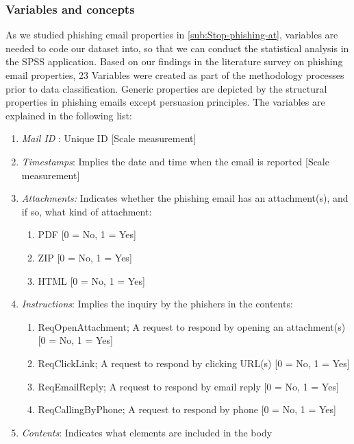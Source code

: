 \subsubsection{\label{sub:variables}Variables and concepts}

As we studied phishing email properties in \autoref{sub:Stop-phishing-at},
variables are needed to code our dataset into, so that we can conduct
the statistical analysis in the SPSS application. Based on our findings
in the literature survey on phishing email properties, 23 Variables
were created as part of the methodology processes prior to data classification.
Generic properties are depicted by the structural properties in phishing
emails except persuasion principles. The variables are explained in
the following list:
\begin{enumerate}
\item \emph{Mail ID} : Unique ID {[}Scale measurement{]}
\item \emph{Timestamps}: Implies the date and time when the email is reported
{[}Scale measurement{]}
\item \emph{Attachments:} Indicates whether the phishing email has an attachment(s),
and if so, what kind of attachment:

\begin{enumerate}
\item PDF {[}0 = No, 1 = Yes{]}
\item ZIP {[}0 = No, 1 = Yes{]}
\item HTML {[}0 = No, 1 = Yes{]}
\end{enumerate}
\item \textit{Instructions}: Implies the inquiry by the phishers in the
contents:

\begin{enumerate}
\item ReqOpenAttachment; A request to respond by opening an attachment(s)
{[}0 = No, 1 = Yes{]}
\item ReqClickLink; A request to respond by clicking URL(s) {[}0 = No, 1
= Yes{]}
\item ReqEmailReply; A request to respond by email reply {[}0 = No, 1 =
Yes{]}
\item ReqCallingByPhone; A request to respond by phone {[}0 = No, 1 = Yes{]}
\end{enumerate}
\item \emph{Contents}: Indicates what elements are included in the body


\end{enumerate}
